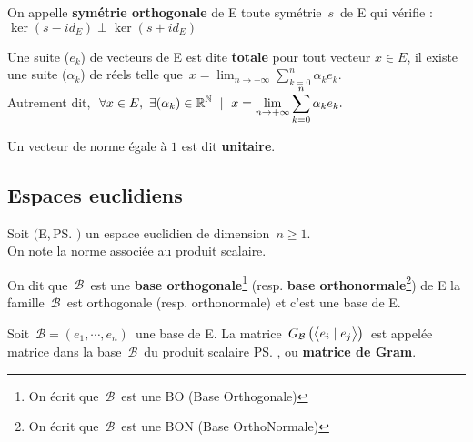 \vspace{0.5cm}

\noindent On appelle \textbf{symétrie orthogonale} de E toute symétrie $\,s\,$ de E qui vérifie : \(\ker (s-id_E)\perp \ker (s+id_E)\)

\vspace{1cm}

Une suite (\(e_k\)) de vecteurs de E est dite \textbf{totale} \ssi pour tout vecteur \(x\in E\), il existe une suite (\(\alpha_k\)) de réels telle que \(\,\displaystyle x =\lim_{n\to +\infty} \sum_{k=0}^{n}\alpha_ke_k. \)\\
Autrement dit, \ssi \(\displaystyle\ \forall x\in E,\ \exists(\alpha_k)\in \mathbb{R}^{\mathbb{N}} \ \mid \ x=\lim_{n\to +\infty} \sum_{k=0}^{n}\alpha_ke_k. \)

\vspace{1cm}

Un vecteur de norme égale à $1$ est dit \textbf{unitaire}.

\vspace{1.5cm}

\subsection{Espaces euclidiens}

\vspace{0.5cm}

\begin{center}
    Soit $\bigl($E,\,\ps$\bigr)$ un espace euclidien de dimension \(\,n\geq 1\).\vspace{0.1cm}\\
    On note \normtxt{\ } la norme associée au produit scalaire.
\end{center}

\vspace{0.7cm}

\noindent On dit que $\,\mathcal{B}\,$ est une \textbf{base orthogonale}\footnote{On écrit que \(\,\mathcal{B}\,\) est une BO (Base Orthogonale)} (resp. \textbf{base orthonormale}\footnote{On écrit que \(\,\mathcal{B}\,\) est une BON (Base OrthoNormale)}) de E \ssi la famille \(\,\mathcal{B}\,\) est orthogonale (resp. orthonormale) et c'est une base de E.

\vspace{1cm}

\noindent Soit \(\,\mathcal{B}=(e_1,\cdots,e_n)\,\) une base de E. La matrice \(\,G_\mathcal{B}\left(\bigl\langle e_i\mid e_j \bigr\rangle\right)\,\) est appelée matrice dans la base \(\,\mathcal{B}\,\) du produit scalaire \ps, ou \textbf{matrice de Gram}.

